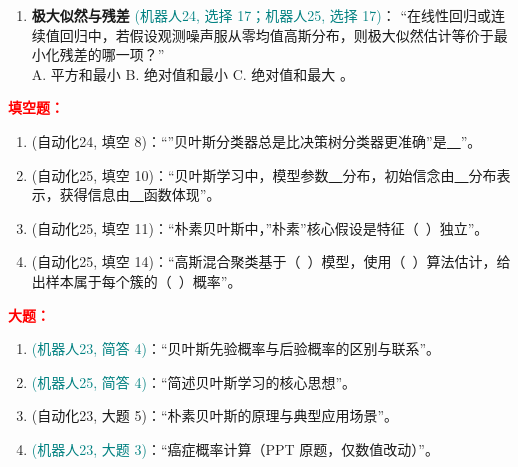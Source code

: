 ﻿\documentclass[../main.tex]{subfiles}
\begin{document}
\begin{enumerate}[itemsep=0.45em, topsep=0.2em, leftmargin=1.5em]
    \item \textbf{极大似然与残差} \textcolor{teal}{(机器人24, 选择 17；机器人25, 选择 17)}：
    ``在线性回归或连续值回归中，若假设观测噪声服从零均值高斯分布，则极大似然估计等价于最小化残差的哪一项？''\\
    A. 平方和最小\quad
    B. 绝对值和最小\quad
    C. 绝对值和最大\quad
    。
\end{enumerate}

\noindent\textbf{\textcolor{red}{填空题：}}
\begin{enumerate}[itemsep=0.3em, topsep=0.2em, leftmargin=1.5em]
    \item \textcolor{autoclassgreen}{(自动化24, 填空 8)}：``''贝叶斯分类器总是比决策树分类器更准确''是\underline{\ \ }''。 
    \item \textcolor{autoclassgreen}{(自动化25, 填空 10)}：``贝叶斯学习中，模型参数\underline{\ \ }分布，初始信念由\underline{\ \ }分布表示，获得信息由\underline{\ \ }函数体现''。 
    \item \textcolor{autoclassgreen}{(自动化25, 填空 11)}：``朴素贝叶斯中，''朴素''核心假设是特征（\ ）独立''。 
    \item \textcolor{autoclassgreen}{(自动化25, 填空 14)}：``高斯混合聚类基于（\ ）模型，使用（\ ）算法估计，给出样本属于每个簇的（\ ）概率''。 
\end{enumerate}

\noindent\textbf{\textcolor{red}{大题：}}
\begin{enumerate}[itemsep=0.3em, topsep=0.2em, leftmargin=1.5em]
    \item \textcolor{teal}{(机器人23, 简答 4)}：``贝叶斯先验概率与后验概率的区别与联系''。 
    \item \textcolor{teal}{(机器人25, 简答 4)}：``简述贝叶斯学习的核心思想''。 
    \item \textcolor{autoclassgreen}{(自动化23, 大题 5)}：``朴素贝叶斯的原理与典型应用场景''。 
    \item \textcolor{teal}{(机器人23, 大题 3)}：``癌症概率计算（PPT 原题，仅数值改动）''。 
\end{enumerate}
\end{document}
